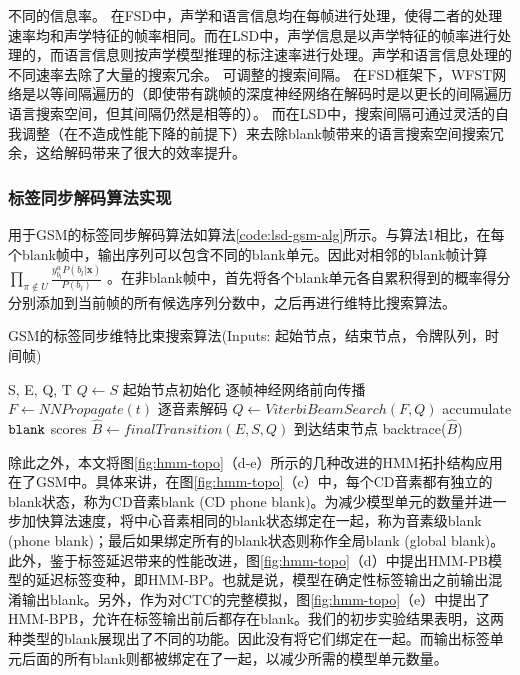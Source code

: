   不同的信息率。 在FSD中，声学和语言信息均在每帧进行处理，使得二者的处理速率均和声学特征的帧率相同。而在LSD中，声学信息是以声学特征的帧率进行处理的，而语言信息则按声学模型推理的标注速率进行处理。声学和语言信息处理的不同速率去除了大量的搜索冗余。
  可调整的搜索间隔。 在FSD框架下，WFST网络是以等间隔遍历的（即使带有跳帧的深度神经网络在解码\cite{vanhoucke2013multiframe}时是以更长的间隔遍历语言搜索空间，但其间隔仍然是相等的）。 而在LSD中，搜索间隔可通过灵活的自我调整（在不造成性能下降的前提下）来去除blank帧带来的语言搜索空间搜索冗余，这给解码带来了很大的效率提升。



\subsubsection{标签同步解码算法实现}
\label{chap:lsd-lsd-hmm-alg}

用于GSM的标签同步解码算法如算法\ref{code:lsd-gsm-alg}所示。与算法1相比，在每个blank帧中，输出序列可以包含不同的blank单元。因此对相邻的blank帧计算$\prod_{\pi\not\in U}\frac{y_{b_l}^u P(b_l|\mathbf{x})}{P(b_l)}$ 。在非blank帧中，首先将各个blank单元各自累积得到的概率得分分别添加到当前帧的所有候选序列分数中，之后再进行维特比搜索算法。


\begin{algorithm}[ht]
\caption{GSM的标签同步维特比束搜索算法\textcolor[rgb]{0,0.5,0}{(Inputs: 起始节点，结束节点，令牌队列，时间帧)}}
\label{code:lsd-gsm-alg}
\begin{algorithmic}[1]
 {S, E, Q, T}
\State $Q \leftarrow S$ \Comment \textcolor[rgb]{0,0.5,0}{起始节点初始化}
    \Comment \textcolor[rgb]{0,0.5,0}{逐帧神经网络前向传播}
\State $F \leftarrow NNPropagate(t)$
    \Comment \textcolor[rgb]{0,0.5,0}{逐音素解码}
\State  {\color{red}{$F \leftarrow addAccumulatedBlankScore(V,F)$ }}
\State  {\color{red}{$reset(V)$ }}
\State  $Q\leftarrow ViterbiBeamSearch(F, Q)$
\Else         \Comment \textcolor[rgb]{0,0.5,0}{accumulate $\tt blank$ scores}
\State  {\color{red}{$V \leftarrow accumulateBlankScore(V,F)$ }}
\EndIf
\EndFor
\State $\hat B\leftarrow finalTransition(E,S,Q)$ \Comment \textcolor[rgb]{0,0.5,0}{到达结束节点}
\State backtrace($\hat B$)
\EndProcedure
\end{algorithmic}
\end{algorithm}



除此之外，本文将图\ref{fig:hmm-topo}（d-e）所示的几种改进的HMM拓扑结构应用在了GSM中。具体来讲，在图\ref{fig:hmm-topo}（c）中，每个CD音素都有独立的blank状态，称为CD音素blank (CD phone blank)。为减少模型单元的数量并进一步加快算法速度，将中心音素相同的blank状态绑定在一起，称为音素级blank (phone blank)；最后如果绑定所有的blank状态则称作全局blank (global blank)。此外，鉴于标签延迟带来的性能改进\cite{amodei2015deep}，图\ref{fig:hmm-topo}（d）中提出HMM-PB模型的延迟标签变种，即HMM-BP。也就是说，模型在确定性标签输出之前输出混淆输出blank。另外，作为对CTC的完整模拟，图\ref{fig:hmm-topo}（e）中提出了HMM-BPB，允许在标签输出前后都存在blank。我们的初步实验结果表明，这两种类型的blank展现出了不同的功能。因此没有将它们绑定在一起。而输出标签单元后面的所有blank则都被绑定在了一起，以减少所需的模型单元数量。

